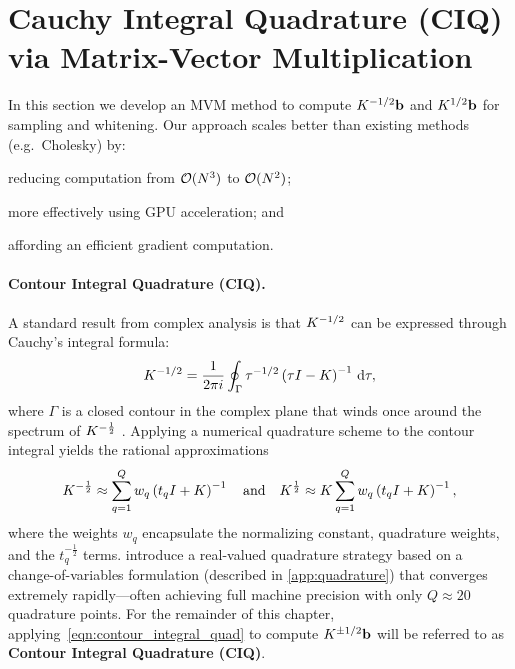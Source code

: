 \section{Cauchy Integral Quadrature (CIQ) via Matrix-Vector Multiplication}
\label{sec:ciq_method}

In this section we develop an MVM method to compute $K^{-1/2} \mathbf{b}$ and $K^{1/2} \mathbf{b}$ for sampling and whitening.
Our approach scales better than existing methods (e.g.~Cholesky) by:
\begin{enumerate*}
  \item reducing computation from $\bigo{N^3}$ to $\bigo{N^2}$;
  \item more effectively using GPU acceleration; and
  \item affording an efficient gradient computation.
\end{enumerate*}

\paragraph{Contour Integral Quadrature (CIQ).}
A standard result from complex analysis is that $K^{-1/2}$ can be expressed through Cauchy's integral formula:
%
$$
	K^{-1 / 2} = \frac{1}{2 \pi i} \oint_\Gamma \tau^{- 1 / 2} \left( \tau I - K \right)^{-1} \,\mathrm{d}{\tau},
$$
%
where $\Gamma$ is a closed contour in the complex plane that winds once around the spectrum of $K^{-\frac 1 2}$ \citep{davies2005computing,hale2008computing,higham2008functions}.
Applying a numerical quadrature scheme to the contour integral yields the rational approximations
%
\begin{equation}
	K^{-\frac 1 2} \approx \sum_{q=1}^Q w_q \left( t_q I + K \right)^{-1}
  \quad \text{and} \quad
	K^{\frac 1 2} \approx K \sum_{q=1}^Q w_q \left( t_q I + K \right)^{-1},
	\label{eqn:contour_integral_quad}
\end{equation}
%
where the weights $w_q$ encapsulate the normalizing constant, quadrature weights, and the $t_q^{-\frac 1 2}$ terms.
\citet{hale2008computing} introduce a real-valued quadrature strategy based on a change-of-variables formulation (described in \cref{app:quadrature})
that converges extremely rapidly---often achieving full machine precision with only $Q \approx 20$ quadrature points.
For the remainder of this chapter, applying~\cref{eqn:contour_integral_quad} to compute $K^{\pm1/2} \mathbf{b}$  will be referred to as {\bf Contour Integral Quadrature (CIQ)}.



